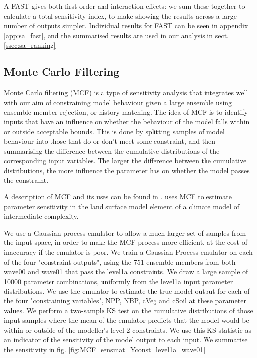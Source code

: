 \documentclass[gmd, manuscript]{copernicus}
\begin{document}
A FAST gives both first order and interaction effects: we sum these together to calculate a total sensitivity index, to make showing the results across a large number of outputs simpler. Individual results for FAST can be seen in appendix \ref{app:sa_fast}, and the summarised results are used in our analysis in sect. \ref{ssec:sa_ranking}


\subsection{Monte Carlo Filtering}\label{ssec:sa_MCF}

Monte Carlo filtering (MCF) is a type of sensitivity analysis that integrates well with our aim of constraining model behaviour given a large ensemble using ensemble member rejection, or history matching. The idea of MCF is to identify inputs that have an influence on whether the behaviour of the model falls within or outside acceptable bounds. This is done by splitting samples of model behaviour into those that do or don't meet some constraint, and then summarising the difference between the cumulative distributions of the corresponding input variables. The larger the difference between the cumulative distributions, the more influence the parameter has on whether the model passes the constraint.

A description of MCF and its uses can be found in \cite{pianosi2016sensitivity}. \cite{mcneall2020correcting} uses MCF to estimate parameter sensitivity in the land surface model element of a climate model of intermediate complexity.

We use a Gaussian process emulator to allow a much larger set of samples from the input space, in order to make the MCF process more efficient, at the cost of inaccuracy if the emulator is poor. We train a Gaussian Process emulator on each of the four "constraint outputs", using the 751 ensemble members from both wave00 and wave01 that pass the level1a constraints. We draw a large sample of 10000 parameter combinations, uniformly from the level1a input parameter distributions. We use the emulator to estimate the true model output for each of the four "constraining variables", NPP, NBP, cVeg and cSoil at these parameter values. We perform a two-sample KS test on the cumulative distributions of those input samples where the mean of the emulator predicts that the model would be within or outside of the modeller's level 2 constraints. We use this KS statistic as an indicator of the sensitivity of the model output to each input. We summarise the sensitivity in fig. \ref{fig:MCF_sensmat_Yconst_level1a_wave01}.
\end{document}
